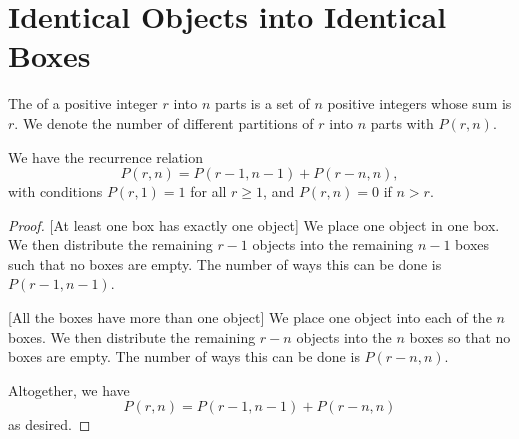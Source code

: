 \section{Identical Objects into Identical Boxes}

\begin{definition}
    The  of a positive integer $r$ into $n$ parts is a set of $n$ positive integers whose sum is $r$. We denote the number of different partitions of $r$ into $n$ parts with $P(r, n)$.
\end{definition}

\begin{proposition}
    We have the recurrence relation \[P(r, n) = P(r-1, n-1) + P(r-n, n),\] with conditions $P(r, 1) = 1$ for all $r \geq 1$, and $P(r, n) = 0$ if $n > r$.
\end{proposition}
\begin{proof}
    [At least one box has exactly one object] We place one object in one box. We then distribute the remaining $r-1$ objects into the remaining $n-1$ boxes such that no boxes are empty. The number of ways this can be done is $P(r-1, n-1)$.

    [All the boxes have more than one object] We place one object into each of the $n$ boxes. We then distribute the remaining $r-n$ objects into the $n$ boxes so that no boxes are empty. The number of ways this can be done is $P(r-n, n)$.

    Altogether, we have \[P(r, n) = P(r-1, n-1) + P(r-n, n)\] as desired.
\end{proof}